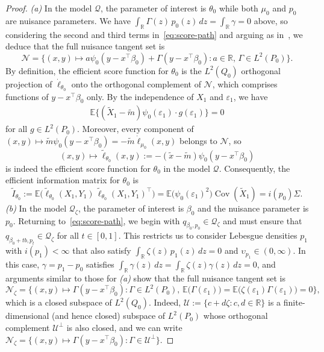 \documentclass[a4paper]{article}
\newcommand{\R}{\mathbb{R}}
\newcommand{\E}{\mathbb{E}}
\DeclareMathOperator\Cov{Cov}
\theoremstyle{definition}
\begin{document}
\begin{proof}
\medskip
\noindent \textit{(a)} In the model $\mathcal{Q}$, the parameter of interest is $\theta_0$ while both $\mu_0$ and $p_0$ are nuisance parameters. We have $\int_\R \Gamma(z)\,p_0(z)\,dz = \int_\R \gamma = 0$ above, so considering the second and third terms in~\eqref{eq:score-path} and arguing as in~\citet[Examples~25.16,~25.24 and~25.28]{vdV1998asymptotic}, we deduce that the full nuisance tangent set is
\[
\mathcal{N} = \bigl\{(x,y) \mapsto a\psi_0(y - x^\top\beta_0) + \Gamma(y - x^\top\beta_0) : a \in \R,\,\Gamma \in L^2(P_0)\bigr\}.
\]
By definition, the efficient score function for $\theta_0$ is the $L^2(Q_0)$ orthogonal projection of $\dot{\ell}_{\theta_0}$ onto the orthogonal complement of $\mathcal{N}$,
which comprises functions of $y - x^\top\beta_0$ only. By the independence of $X_1$ and $\varepsilon_1$, we have
\begin{align}
\label{eq:score-indep-orthogonal}
\E\bigl\{(\tilde{X}_1 - \tilde{m})\psi_0(\varepsilon_1) \cdot g(\varepsilon_1)\bigr\} = 0
\end{align}
for all $g \in L^2(P_0)$. Moreover, every component of $(x,y) \mapsto \tilde{m}\psi_0(y - x^\top\beta_0) = -\tilde{m}\dot{\ell}_{\mu_0}(x,y)$ belongs to $\mathcal{N}$, so
\[
(x,y) \mapsto \tilde{\ell}_{\theta_0}(x,y) := -(\tilde{x} - \tilde{m})\psi_0(y - x^\top\beta_0)
\]
is indeed the efficient score function for $\theta_0$ in the model $\mathcal{Q}$. Consequently, the efficient information matrix for $\theta_0$ is
\[
\tilde{I}_{\theta_0} := \E\bigl(\tilde{\ell}_{\theta_0}(X_1,Y_1)\,\tilde{\ell}_{\theta_0}(X_1,Y_1)^\top\bigr) = \E\bigl(\psi_0(\varepsilon_1)^2\bigr)\Cov(\tilde{X}_1) = i(p_0)\Sigma.
\]
\textit{(b)} In the model $\mathcal{Q}_\zeta$, the parameter of interest is $\beta_0$ and the nuisance parameter is $p_0$. Returning to~\eqref{eq:score-path}, we begin with $q_{\beta_0,p_0} \in \mathcal{Q}_\zeta$ and must ensure that $q_{\beta_0 + tb,p_t} \in \mathcal{Q}_\zeta$ for all $t \in [0,1]$. This restricts us to consider Lebesgue densities $p_1$ with $i(p_1) < \infty$ that also satisfy $\int_\R \zeta(z)\,p_1(z)\,dz = 0$ and $\upsilon_{p_1} \in (0,\infty)$. In this case, $\gamma = p_1 - p_0$ satisfies $\int_\R \gamma(z)\,dz = \int_\R \zeta(z)\gamma(z)\,dz = 0$, and arguments similar to those for \textit{(a)} show that the full nuisance tangent set is 
\[
\mathcal{N}_\zeta = \bigl\{(x,y) \mapsto \Gamma(y - x^\top\beta_0) : \Gamma \in L^2(P_0),\,\E\bigl(\Gamma(\varepsilon_1)\bigr) = \E\bigl(\zeta(\varepsilon_1)\Gamma(\varepsilon_1)\bigr) = 0\bigr\},
\]
which is a closed subspace of $L^2(Q_0)$. Indeed, $\mathcal{U} := \{c + d\zeta : c,d \in \R\}$ is a finite-dimensional (and hence closed) subspace of $L^2(P_0)$ whose orthogonal complement $\mathcal{U}^\perp$ is also closed, and we can write $\mathcal{N}_\zeta = \bigl\{(x,y) \mapsto \Gamma(y - x^\top\beta_0) : \Gamma \in \mathcal{U}^\perp\}$.


\end{proof}
\end{document}

